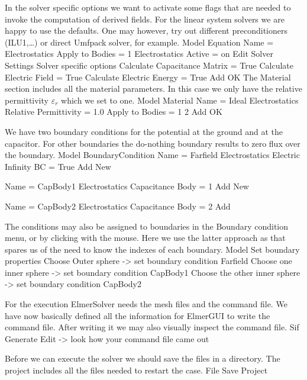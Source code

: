 In the solver specific options we want to activate some flags that are needed to invoke the 
computation of derived fields. 
For the linear system solvers we are happy to use the defaults. One may however, try out different
preconditioners (ILU1,\ldots) or direct Umfpack solver, for example.
\ttbegin
Model
  Equation
    Name = Electrostatics
    Apply to Bodies = 1
    Electrostatics
      Active = on
      Edit Solver Settings
        Solver specific options
          Calculate Capacitance Matrix = True
          Calculate Electric Field = True
          Calculate Electric Energy = True
    Add 
    OK
\ttend        
The Material section includes all the material parameters.
In this case we only have the relative permittivity $\varepsilon_r$ which we set to one.
\ttbegin
Model
  Material
    Name = Ideal
    Electrostatics
      Relative Permittivity = 1.0
    Apply to Bodies = 1 2
    Add
    OK
\ttend

We have two boundary conditions for the potential at the ground and at the capacitor. For other boundaries
the do-nothing boundary results to zero flux over the boundary.
\ttbegin
Model
  BoundaryCondition
    Name = Farfield
    Electrostatics
      Electric Infinity BC = True
    Add
    New

    Name = CapBody1
    Electrostatics
      Capacitance Body = 1
    Add
    New

    Name = CapBody2
    Electrostatics
      Capacitance Body = 2
    Add
\ttend   

The conditions may also be assigned to boundaries in the Boundary condition menu, or 
by clicking with the mouse. Here we use the latter approach as that spares us of the 
need to know the indexes of each boundary.
\ttbegin
Model
  Set boundary properties
    Choose Outer sphere -> set boundary condition Farfield
    Choose one inner sphere -> set boundary condition CapBody1
    Choose the other inner sphere -> set boundary condition CapBody2
\ttend

For the execution 
ElmerSolver needs the mesh files and the command file. We have now basically defined
all the information for ElmerGUI to write the command file. After writing it we may also visually 
inspect the command file.
\ttbegin
Sif 
  Generate
  Edit -> look how your command file came out  
\ttend

Before we can execute the solver we should save the files in a directory. The project includes
all the files needed to restart the case.
\ttbegin
File 
  Save Project
\ttend


